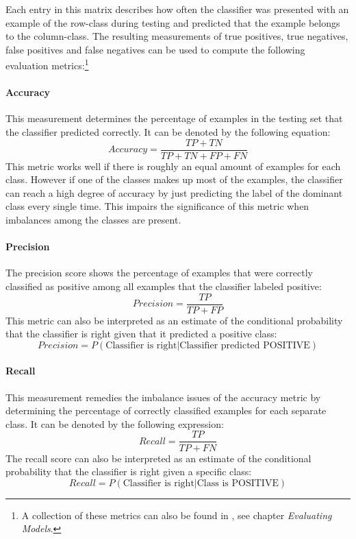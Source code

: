 Each entry in this matrix describes how often the
classifier was presented with an example of the row-class during testing and
predicted that the example belongs to the column-class. The resulting
measurements of true positives, true negatives, false positives and
false negatives can be used to compute the following evaluation
metrics:\footnote{A collection of these metrics can also be found in
  \cite{Patterson}, see chapter \textit{Evaluating Models}.}

\paragraph{Accuracy} This measurement determines the percentage of
examples in the testing set that the classifier predicted correctly.
It can be denoted by the following equation:
\begin{equation}
  Accuracy = \frac{TP + TN}{TP + TN + FP + FN}
\end{equation}
This metric works well if there is roughly an equal amount of examples
for each class. However if one of the classes makes up most of the
examples, the classifier can reach a high degree of accuracy by just
predicting the label of the dominant class every single time. This
impairs the significance of this metric when imbalances among the
classes are present.

\paragraph{Precision} The precision score shows the percentage of
examples that were correctly classified as positive among all examples
that the classifier labeled positive:
\begin{equation}
  Precision = \frac{TP}{TP + FP}
\end{equation}
This metric can also be interpreted as an estimate of the conditional probability
that the classifier is right given that it predicted a positive class:
\begin{equation*}
  Precision = P(\text{Classifier is right} \vert \text{Classifier predicted
    POSITIVE})
\end{equation*}

\paragraph{Recall} This measurement remedies the imbalance issues of
the accuracy metric by determining the percentage of correctly
classified examples for each separate class. It can be denoted by the
following expression:
\begin{equation}
  Recall = \frac{TP}{TP + FN}
\end{equation}
The recall score can also be interpreted as an estimate of the conditional
probability that the
classifier is right given a specific class:
\begin{equation*}
  Recall = P(\text{Classifier is right} \vert \text{Class is POSITIVE})
\end{equation*}

